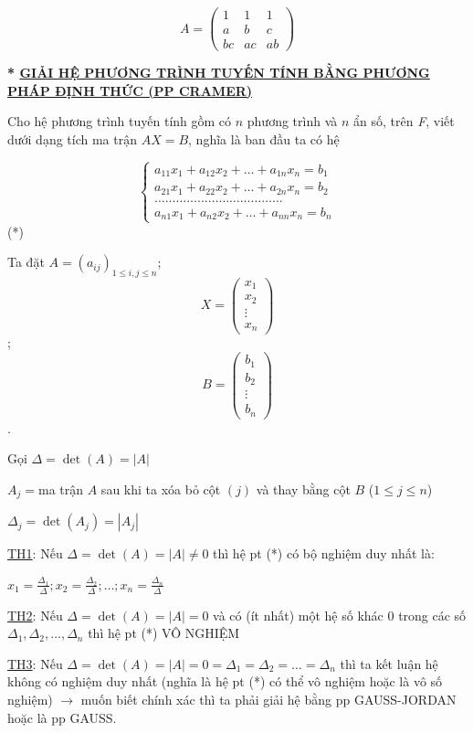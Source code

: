 \documentclass[
]{article}
\let\ul\uline
\begin{document}
$$A = \begin{pmatrix} 1 & 1 & 1 \\ a & b & c \\ bc & ac & ab \end{pmatrix}$$

\textbf{* \ul{GIẢI HỆ PHƯƠNG TRÌNH TUYẾN TÍNH BẰNG PHƯƠNG PHÁP ĐỊNH THỨC
(PP CRAMER)}}

Cho hệ phương trình tuyến tính gồm có
$n$ phương trình
và $n$ ẩn số, trên
\emph{F}, viết dưới dạng tích ma trận
$AX = B$, nghĩa là ban
đầu ta có hệ

$$\begin{cases} a_{11} x_1 + a_{12} x_2 + \dots + a_{1n} x_n = b_1 \\ a_{21} x_1 + a_{22} x_2 + \dots + a_{2n} x_n = b_2 \\ \dots \dots \dots \dots \dots \dots \dots \dots \dots \dots \dots \dots \\ a_{n1} x_1 + a_{n2} x_2 + \dots + a_{nn} x_n = b_n \end{cases}$$ (*)

Ta đặt $A = (a_{ij})_{1 \le i, j \le n}$;
$$X = \begin{pmatrix} x_1 \\ x_2 \\ \vdots \\ x_n \end{pmatrix}$$;
$$B = \begin{pmatrix} b_1 \\ b_2 \\ \vdots \\ b_n \end{pmatrix}$$.

Gọi $\Delta = \det(A) = |A|$

$A_j =$ma trận
$A$ sau khi ta xóa
bỏ cột $(j)$ và thay
bằng cột $B$
($1 \le j \le n$)

$\Delta_j = \det(A_j) = |A_j|$

\ul{TH1}: Nếu $\Delta = \det(A) = |A| \neq 0$
thì hệ pt (*) có bộ nghiệm duy nhất là:

$x_1 = \frac{\Delta_1}{\Delta}; x_2 = \frac{\Delta_2}{\Delta}; \dots; x_n = \frac{\Delta_n}{\Delta}$

\ul{TH2}: Nếu $\Delta = \det(A) = |A| = 0$
và có (ít nhất) một hệ số khác 0 trong các số
$\Delta_1, \Delta_2, \dots, \Delta_n$ thì hệ pt (*)
VÔ NGHIỆM

\ul{TH3}: Nếu $\Delta = \det(A) = |A| = 0 = \Delta_1 = \Delta_2 = \dots = \Delta_n$
thì ta kết luận hệ không có nghiệm duy nhất (nghĩa là hệ pt (*) có thể
vô nghiệm hoặc là vô số nghiệm) $\rightarrow$ muốn biết chính xác thì ta phải giải
hệ bằng pp GAUSS-JORDAN hoặc là pp GAUSS.
\end{document}
